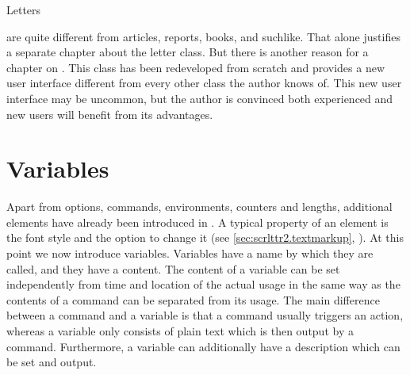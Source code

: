 \iffalse
  Since the June 2002 release {\KOMAScript} provides a completely
  rewritten letter class\ChangedAt{v2.8q}{\Class{scrlttr2}}. Although
  part of the code is identical to that of the main classes described
  in \autoref{cha:maincls}, letters
\else
  Letters
\fi
are quite different from articles,
reports, books, and suchlike.  That alone justifies a separate
chapter about the letter class. But there is another reason for a
chapter on . This class has been redeveloped from
scratch and provides a new user interface different from every other
class the author knows of. This new user interface may be uncommon,
but the author is convinced both experienced and new {\KOMAScript}
users will benefit from its advantages.


\section{Variables}
%
\BeginIndexGroup
{}

Apart from options, commands, environments, counters and lengths,
additional elements have already been introduced in \KOMAScript.  A
typical property of an element is the font style and the option to
change it (see \autoref{sec:scrlttr2.textmarkup},
). At this point we now
introduce variables. Variables have a name by which they are called,
and they have a content. The content of a variable can be set
independently from time and location of the actual usage in the same
way as the contents of a command can be separated from its usage. The
main difference between a command and a variable is that a command
usually triggers an action, whereas a variable only consists of plain
text which is then output by a command. Furthermore, a variable can
additionally have a description which can be set and output.

